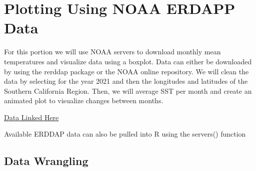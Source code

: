 \documentclass[]{tufte-handout}
\begin{document}
\hypertarget{plotting-using-noaa-erdapp-data}{%
\section{Plotting Using NOAA ERDAPP
Data}\label{plotting-using-noaa-erdapp-data}}

For this portion we will use NOAA servers to download monthly mean
temperatures and visualize data using a boxplot. Data can either be
downloaded by using the rerddap package or the NOAA online repository.
We will clean the data by selecting for the year 2021 and then the
longitudes and latitudes of the Southern California Region. Then, we
will average SST per month and create an animated plot to visualize
changes between months.

\href{https://psl.noaa.gov/repository/entry/show?entryid=cac1c2a6-a864-4409-bb77-1fdead8eeb6e}{Data
Linked Here}

Available ERDDAP data can also be pulled into R using the servers()
function

\hypertarget{data-wrangling-1}{%
\subsection{Data Wrangling}\label{data-wrangling-1}}
\end{document}
